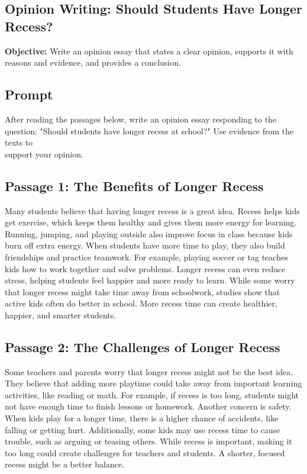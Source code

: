 \documentclass[12pt]{article}
\begin{document}
\subsection*{Opinion Writing: Should Students Have Longer Recess?}
\onehalfspacing

\begin{tcolorbox}[colframe=black!40, colback=gray!0, title=Learning Objective]
\textbf{Objective:} Write an opinion essay that states a clear opinion, supports it with reasons and evidence, and provides a conclusion.
\end{tcolorbox}

\subsection*{Prompt}

After reading the passages below, write an opinion essay responding to the question:  
"Should students have longer recess at school?" 
Use evidence from the texts to \\support your opinion.

\subsection*{Passage 1: The Benefits of Longer Recess}

Many students believe that having longer recess is a great idea. Recess helps kids get exercise, which keeps them healthy and gives them more energy for learning. Running, jumping, and playing outside also improve focus in class because kids burn off extra energy. When students have more time to play, they also build \\friendships and practice teamwork. For example, playing soccer or tag teaches kids how to work together and solve problems. Longer recess can even reduce stress, helping students feel happier and more ready to learn. While some worry that longer recess might take time away from schoolwork, studies show that active kids often do better in school. More recess time can create healthier, happier, and smarter students.

\subsection*{Passage 2: The Challenges of Longer Recess}

Some teachers and parents worry that longer recess might not be the best idea. They believe that adding more playtime could take away from important learning activities, like reading or math. For example, if recess is too long, students might not have enough time to finish lessons or homework. Another concern is safety. When kids play for a longer time, there is a higher chance of accidents, like falling or getting hurt. Additionally, some kids may use recess time to cause trouble, such as arguing or teasing others. While recess is important, making it too long could create challenges for teachers and students. A shorter, focused recess might be a better balance.
\newpage
\end{document}
